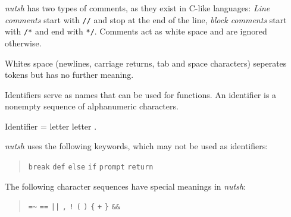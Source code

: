 \documentclass[paper=a4,twoside,abstract=on,cleardoublepage=empty,numbers=noenddot,toc=bib,12pt,appendixprefix=true]{scrreprt}
\begin{document}

\emph{nutsh} has two types of comments, as they exist in C-like languages: \emph{Line comments} start with \texttt{//} and stop at the end of the line, \emph{block comments} start with \texttt{/*} and end with \texttt{*/}. Comments act as white space and are ignored otherwise.


Whites space (newlines, carriage returns, tab and space characters) seperates tokens but has no further meaning.


Identifiers serve as names that can be used for functions. An identifier is a nonempty sequence of alphanumeric characters.

\begin{ebnf}
Identifier = letter { letter } .
\end{ebnf}


\emph{nutsh} uses the following keywords, which may not be used as identifiers:

\begin{quote}
    \texttt{break}\hspace{0.5em}
    \texttt{def}\hspace{0.5em}
    \texttt{else}\hspace{0.5em}
    \texttt{if}\hspace{0.5em}
    \texttt{prompt}\hspace{0.5em}
    \texttt{return}
\end{quote}


The following character sequences have special meanings in \emph{nutsh}:

\begin{quote}
    \texttt{=\~}\hspace{1em}
    \texttt{==}\hspace{1em}
    \texttt{||}\hspace{1em}
    \texttt{,}\hspace{1em}
    \texttt{!}\hspace{1em}
    \texttt{(}\hspace{1em}
    \texttt{)}\hspace{1em}
    \texttt{\{}\hspace{1em}
    \texttt{+}\hspace{1em}
    \texttt{\}}\hspace{1em}
    \texttt{\&\&}
\end{quote}
\end{document}
